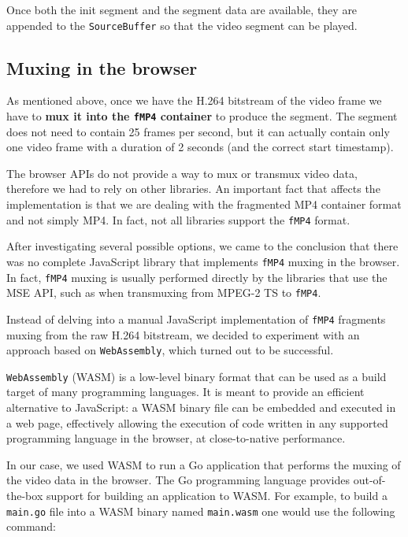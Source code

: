 Once both the init segment and the segment data are available, they are appended to the \texttt{SourceBuffer} so that the video segment can be played.

\subsection{Muxing in the browser}
\label{sec:improvements/impl/muxing}

As mentioned above, once we have the H.264 bitstream of the video frame we have to \textbf{mux it into the \texttt{fMP4} container} to produce the segment. The segment does not need to contain 25 frames per second, but it can actually contain only one video frame with a duration of 2 seconds (and the correct start timestamp).

The browser APIs do not provide a way to mux or transmux video data, therefore we had to rely on other libraries. An important fact that affects the implementation is that we are dealing with the fragmented MP4 container format and not simply MP4. In fact, not all libraries support the \texttt{fMP4} format.

After investigating several possible options, we came to the conclusion that there was no complete JavaScript library that implements \texttt{fMP4} muxing in the browser. In fact, \texttt{fMP4} muxing is usually performed directly by the libraries that use the MSE API, such as \hlsjs{} when transmuxing from MPEG-2 TS to \texttt{fMP4}.

Instead of delving into a manual JavaScript implementation of \texttt{fMP4} fragments muxing from the raw H.264 bitstream, we decided to experiment with an approach based on \texttt{WebAssembly}, which turned out to be successful.

\texttt{WebAssembly} (WASM) is a low-level binary format that can be used as a build target of many programming languages. It is meant to provide an efficient alternative to JavaScript: a WASM binary file can be embedded and executed in a web page, effectively allowing the execution of code written in any supported programming language in the browser, at close-to-native performance.

In our case, we used WASM to run a Go application that performs the muxing of the video data in the browser. The Go programming language provides out-of-the-box support for building an application to WASM. For example, to build a \texttt{main.go} file into a WASM binary named \texttt{main.wasm} one would use the following command:

